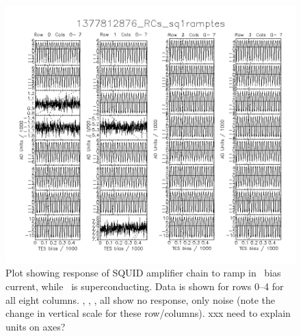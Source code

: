 \begin{figure}[th]
\centering
\includegraphics[width=\textwidth]{./images/1377812876_RCs_sq1ramptes_00.png}
\caption{Plot showing response of SQUID amplifier chain to ramp in \TES\ bias current, while \TES\ is superconducting. Data is shown for rows 0--4 for all eight columns. , , ,  all show no response, only noise (note the change in vertical scale for these row/columns). xxx need to explain units on axes?}
\label{fig:tes-bias-ramp-sc}
\end{figure}


